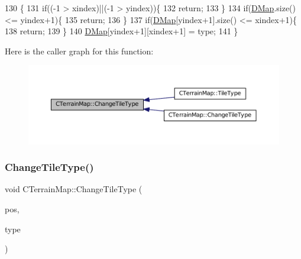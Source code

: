 \begin{DoxyCode}
130                                                                       \{
131     \textcolor{keywordflow}{if}((-1 > xindex)||(-1 > yindex))\{
132         \textcolor{keywordflow}{return};    
133     \}
134     \textcolor{keywordflow}{if}(\hyperlink{classCTerrainMap_a80d154ce478948b10473534a7bca13f6}{DMap}.size() <= yindex+1)\{
135         \textcolor{keywordflow}{return};   
136     \}
137     \textcolor{keywordflow}{if}(\hyperlink{classCTerrainMap_a80d154ce478948b10473534a7bca13f6}{DMap}[yindex+1].size() <= xindex+1)\{
138         \textcolor{keywordflow}{return};   
139     \}
140     \hyperlink{classCTerrainMap_a80d154ce478948b10473534a7bca13f6}{DMap}[yindex+1][xindex+1] = type;
141 \}
\end{DoxyCode}
Here is the caller graph for this function\+:
\nopagebreak
\begin{figure}[H]
\begin{center}
\leavevmode
\includegraphics[width=350pt]{classCTerrainMap_a40757d66d7458620a327d6f69a35a2bd_icgraph}
\end{center}
\end{figure}
\hypertarget{classCTerrainMap_a4a4f26c13a3d8116f4295bef3c25c3e5}{}\label{classCTerrainMap_a4a4f26c13a3d8116f4295bef3c25c3e5} 
\subsubsection{\texorpdfstring{Change\+Tile\+Type()}{ChangeTileType()}\hspace{0.1cm}{\footnotesize\ttfamily [2/2]}}
{\footnotesize\ttfamily void C\+Terrain\+Map\+::\+Change\+Tile\+Type (\begin{DoxyParamCaption}\item[{const \hyperlink{classCPosition}{C\+Position} \&}]{pos,  }\item[{\hyperlink{classCTerrainMap_aff2ab991e237269941416dd79d8871d4}{E\+Tile\+Type}}]{type }\end{DoxyParamCaption})\hspace{0.3cm}{\ttfamily [inline]}}



